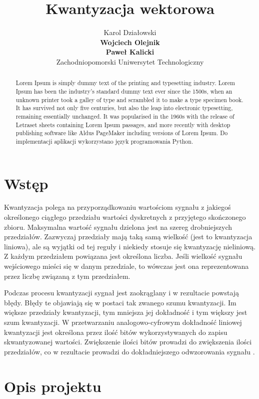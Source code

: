 \documentclass{article}
\title{Kwantyzacja wektorowa}
\author{
  Karol Działowski \\
  \textbf{Wojciech Olejnik} \\
  \textbf{Paweł Kalicki} \\
  Zachodniopomorski Uniwersytet Technologiczny
}
\begin{document}
\maketitle
\begin{abstract}
Lorem Ipsum is simply dummy text of the printing and typesetting industry. Lorem Ipsum has been the industry's standard dummy text ever since the 1500s, when an unknown printer took a galley of type and scrambled it to make a type specimen book. It has survived not only five centuries, but also the leap into electronic typesetting, remaining essentially unchanged. It was popularised in the 1960s with the release of Letraset sheets containing Lorem Ipsum passages, and more recently with desktop publishing software like Aldus PageMaker including versions of Lorem Ipsum. Do implementacji aplikacji wykorzystano język programowania Python.
\end{abstract}




\section{Wstęp}

Kwantyzacja polega na przyporządkowaniu wartościom sygnału z jakiegoś określonego ciągłego przedziału wartości dyskretnych z przyjętego skończonego zbioru. Maksymalna wartość sygnału dzielona jest na szereg drobniejszych przedziałów. Zazwyczaj przedziały mają taką samą wielkość (jest to kwantyzacja liniowa), ale są wyjątki od tej reguły i niekiedy stosuje się kwantyzację nieliniową. Z każdym przedziałem powiązana jest określona liczba. Jeśli wielkość sygnału wejściowego mieści się w danym przedziale, to wówczas jest ona reprezentowana przez liczbę związaną z tym przedziałem.

Podczas procesu kwantyzacji sygnał jest zaokrąglany i w rezultacie powstają błędy. Błędy te objawiają się w postaci tak zwanego szumu kwantyzacji. Im większe przedziały kwantyzacji, tym mniejsza jej dokładność i tym większy jest szum kwantyzacji. W przetwarzaniu analogowo-cyfrowym dokładność liniowej kwantyzacji jest określona przez ilość bitów wykorzystywanych do zapisu skwantyzowanej wartości. Zwiększenie ilości bitów prowadzi do zwiększenia ilości przedziałów, co w rezultacie prowadzi do dokładniejszego odwzorowania sygnału \cite{drozdek2007wprowadzenie}.

\section{Opis projektu}
\end{document}
